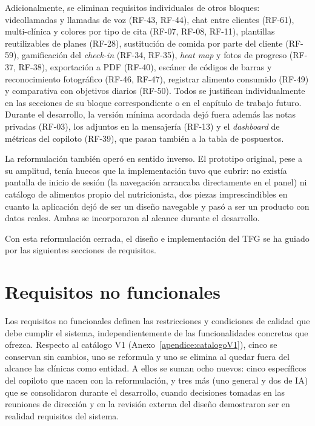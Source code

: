 Adicionalmente, se eliminan requisitos individuales de otros bloques: videollamadas y llamadas de voz (RF-43, RF-44), chat entre clientes (RF-61), multi-clínica y colores por tipo de cita (RF-07, RF-08, RF-11), plantillas reutilizables de planes (RF-28), sustitución de comida por parte del cliente (RF-59), gamificación del \textit{check-in} (RF-34, RF-35), \textit{heat map} y fotos de progreso (RF-37, RF-38), exportación a PDF (RF-40), escáner de códigos de barras y reconocimiento fotográfico (RF-46, RF-47), registrar alimento consumido (RF-49) y comparativa con objetivos diarios (RF-50). Todos se justifican individualmente en las secciones de su bloque correspondiente o en el capítulo de trabajo futuro. Durante el desarrollo, la versión mínima acordada dejó fuera además las notas privadas (RF-03), los adjuntos en la mensajería (RF-13) y el \textit{dashboard} de métricas del copiloto (RF-39), que pasan también a la tabla de pospuestos.

La reformulación también operó en sentido inverso. El prototipo original, pese a su amplitud, tenía huecos que la implementación tuvo que cubrir: no existía pantalla de inicio de sesión (la navegación arrancaba directamente en el panel) ni catálogo de alimentos propio del nutricionista, dos piezas imprescindibles en cuanto la aplicación dejó de ser un diseño navegable y pasó a ser un producto con datos reales. Ambas se incorporaron al alcance durante el desarrollo.

Con esta reformulación cerrada, el diseño e implementación del TFG se ha guiado por las siguientes secciones de requisitos.

\section{Requisitos no funcionales}
\label{sec:rnf}

Los requisitos no funcionales definen las restricciones y condiciones de calidad que debe cumplir el sistema, independientemente de las funcionalidades concretas que ofrezca. Respecto al catálogo V1 (Anexo~\ref{apendice:catalogoV1}), cinco se conservan sin cambios, uno se reformula y uno se elimina al quedar fuera del alcance las clínicas como entidad. A ellos se suman ocho nuevos: cinco específicos del copiloto que nacen con la reformulación, y tres más (uno general y dos de IA) que se consolidaron durante el desarrollo, cuando decisiones tomadas en las reuniones de dirección y en la revisión externa del diseño demostraron ser en realidad requisitos del sistema.

